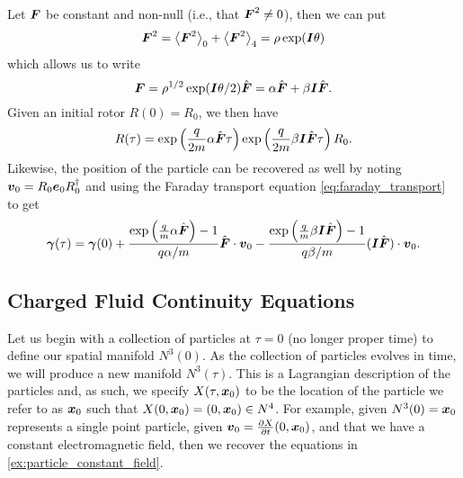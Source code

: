 \documentclass{article}
\begin{document}
\begin{example}
\label{ex:particle_constant_field}
Let $\blade{F}$ be constant and non-null (i.e., that $\blade{F}^2\neq 0$), then we can put
\begin{equation}
\blade{F}^2 = \proj{0}{\blade{F}^2}+\proj{4}{\blade{F}^2}=\rho \exp(\blade{I}\theta)
\end{equation}
which allows us to write 
\begin{equation}
\blade{F}=\rho^{1/2}\exp(\blade{I}\theta/2)\hat{\blade{F}}=\alpha \hat{\blade{F}}+\beta\blade{I} \hat{\blade{F}}.
\end{equation}
Given an initial rotor $R(0)=R_0$, we then have
\begin{equation}
R(\tau)=\exp\left(\frac{q}{2m}\alpha \hat{\blade{F}}\tau\right)\exp\left(\frac{q}{2m}\beta\blade{I}\hat{\blade{F}}\tau\right)R_0.
\end{equation}
Likewise, the position of the particle can be recovered as well by noting $\blade{v}_0=R_0\blade{e}_0 R_0^\dagger$ and using the Faraday transport equation \cref{eq:faraday_transport} to get
\begin{equation}
\blade{\gamma}(\tau) = \blade{\gamma}(0)+\frac{\exp\left(\frac{q}{m}\alpha \hat{\blade{F}}\right)-1}{q\alpha/m} \hat{\blade{F}}\cdot \blade{v}_0 - \frac{\exp\left(\frac{q}{m}\beta \blade{I}\hat{\blade{F}}\right)-1}{q\beta/m}(\blade{I}\hat{\blade{F}})\cdot \blade{v}_0.
\end{equation}
\end{example}


\subsection{Charged Fluid Continuity Equations}
\label{subsec:charged_fluid}

Let us begin with a collection of particles at $\tau=0$ (no longer proper time) to define our spatial manifold $N^3(0)$. As the collection of particles evolves in time, we will produce a new manifold $N^3(\tau)$. This is a Lagrangian description of the particles and, as such, we specify $X(\tau, \blade{x}_0)$ to be the location of the particle we refer to as $\blade{x}_0$ such that $X(0,\blade{x}_0)=(0,\blade{x}_0)\in N^4$. For example, given $N^3(0)=\blade{x}_0$ represents a single point particle, given $\blade{v}_0=\frac{\partial X}{\partial t}(0,\blade{x}_0)$, and that we have a constant electromagnetic field, then we recover the equations in \cref{ex:particle_constant_field}.
\end{document}
